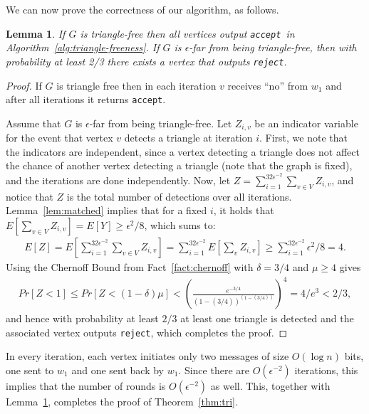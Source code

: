 \documentclass[11pt]{article}
\newtheorem{lemma}[theorem]{Lemma}
\newcommand{\accept}{\texttt{accept}}
\newcommand{\reject}{\texttt{reject}}
\begin{document}
We can now prove the correctness of our algorithm, as follows.	

\begin{lemma}
\label{lem:tri-test}
If $G$ is triangle-free then all vertices output \accept ~in Algorithm~\ref{alg:triangle-freeness}. If $G$ is $\epsilon$-far from being triangle-free, then with probability at least 2/3 there exists a vertex that outputs \reject.
\end{lemma}

\begin{proof}
If $G$ is triangle free then in each iteration $v$ receives ``no'' from $w_1$ and after all iterations it returns \accept.

Assume that $G$ is $\epsilon$-far from being triangle-free. Let $Z_{i,v}$ be an indicator variable for the event that vertex $v$ detects a triangle at iteration $i$.
First, we note that the indicators are independent, since a vertex detecting a triangle does not affect the chance of another vertex detecting a triangle (note that the graph is fixed), and the iterations are done independently.
Now, let $Z=\sum_{i=1}^{32\epsilon^{-2}} \sum_{v \in V} Z_{i,v}$, and notice that $Z$ is the total number of detections over all iterations. Lemma~\ref{lem:matched} implies that for a fixed $i$, it holds that $E[\sum_{v \in V} Z_{i,v}] = E[Y] \geq \epsilon^2/8$, which sums to:
\begin{align*}
E[Z] = E\left[\sum_{i=1}^{32\epsilon^{-2}} \sum_{v \in V}  Z_{i,v}\right] = \sum_{i=1}^{32\epsilon^{-2}} E\left[\sum_v Z_{i,v}\right] \geq \sum_{i=1}^{32\epsilon^{-2}} \epsilon^2/8 = 4.
\end{align*}
Using the Chernoff Bound from Fact~\ref{fact:chernoff} with $\delta=3/4$ and $\mu \geq 4$ gives
\begin{align*}
Pr[Z < 1] \leq Pr[Z < (1-\delta)\mu] < (\frac{e^{-3/4}}{(1-(3/4))^{(1-(3/4))}})^{4} = 4/e^3 < 2/3,
\end{align*}
and hence with probability at least $2/3$ at least one triangle is detected and the associated vertex outputs \reject, which completes the proof.
\end{proof}	


In every iteration, each vertex initiates only two messages of size $O(\log{n})$ bits, one sent to
$w_1$ and one sent back by $w_1$. Since there are $O(\epsilon^{-2})$ iterations, this implies that the
number of rounds is $O(\epsilon^{-2})$ as well. This, together with Lemma~\ref{lem:tri-test},
completes the proof of Theorem~\ref{thm:tri}.
\end{document}
